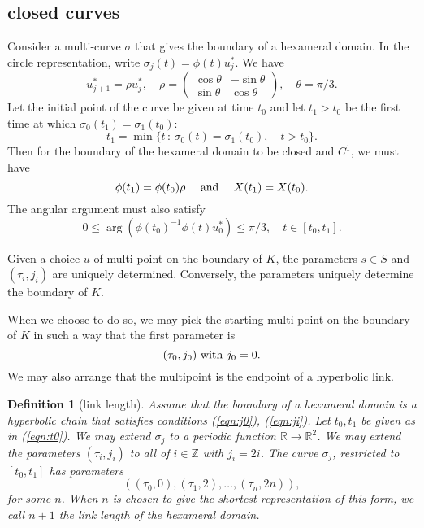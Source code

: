 \documentclass[11pt]{amsart}
\newtheorem{definition}[equation]{Definition}
\newcommand{\ring}[1]{\mathbb{#1}}
\def\rZ{{\ring{Z}}}
\def\rR{{\ring{R}}}
\def\ta{{\tau}}
\def\mid{\,:\,}
\begin{document}
\subsection{closed curves}

Consider a multi-curve $\sigma$ that gives the boundary of a hexameral
domain.  In the circle representation, write $\sigma_j(t) =
\phi(t)u^*_j$.  We have
\[
u^*_{j+1} = \rho u^*_j,\quad \rho=
\left(\begin{array}{ccc} \cos\theta & -\sin\theta\\ 
\sin\theta & \cos\theta\end{array}\right),\quad \theta=\pi/3.
\]
Let the initial point of the curve be given at time $t_0$ and let
$t_1>t_0$ be the first time at which $\sigma_0(t_1) = \sigma_1(t_0)$:
\begin{equation}\label{eqn:t0}
t_1 = \min \{ t \mid \sigma_0(t) = \sigma_1(t_0), \quad t>t_0\}.
\end{equation} 
Then for the boundary of the hexameral domain to be closed
and $C^1$, we must have
\begin{equation}\label{eqn:closed}
\phi(t_1) = \phi(t_0)\rho\quad\hbox{ and }\quad X(t_1) = X(t_0).
\end{equation}
The angular argument must also satisfy
\begin{equation}\label{eqn:arg}
0\le \arg (\phi(t_0)^{-1}\phi(t)u^*_0) \le \pi/3,\quad t\in[t_0,t_1].
\end{equation}

Given a choice $u$ of multi-point on the boundary of $K$, the parameters
$s\in S$ and $(\ta_i,j_i)$ are uniquely determined.  Conversely, the
parameters uniquely determine the boundary of $K$.

When we choose to do so, we may pick the starting multi-point on
the boundary of $K$ in such a way
that the first parameter is
\begin{equation}\label{eqn:j0}
(\ta_0,j_0) \hbox{ with } j_0=0.
\end{equation}  
We may also arrange
that the multipoint is the endpoint of a hyperbolic link.

\begin{definition}[link length]
Assume that the boundary of a hexameral domain is a hyperbolic
chain that satisfies conditions (\ref{eqn:j0}), (\ref{eqn:ji}).
Let $t_0,t_1$ be given as in (\ref{eqn:t0}).  We may extend
$\sigma_j$ to a periodic function $\rR\to\rR^2$.  We may extend
the parameters $(\ta_i,j_i)$ to all of $i\in\rZ$ with $j_i = 2i$.
The curve $\sigma_j$, restricted to $[t_0,t_1]$ has parameters
\[
((\ta_0,0),(\ta_1,2),\ldots,(\ta_n,2n)),
\]
for some $n$.  When $n$ is chosen to give the shortest representation
of this form, we call $n+1$ the {\it link length} of the hexameral
domain.
\end{definition}
\end{document}
